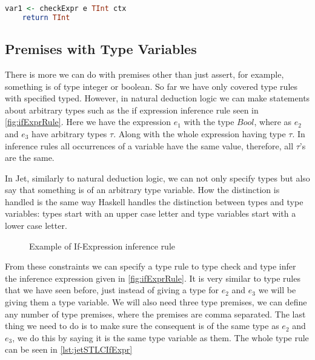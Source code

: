 \begin{lstlisting}[caption = Code generated for inferExpr from TExprPred, label=lst:codeTExprPredInfer, language=Haskell]
    var1 <- checkExpr e TInt ctx
    return TInt
\end{lstlisting}

\subsection{Premises with Type Variables}
There is more we can do with premises other than just assert, for example, something is of type integer or boolean.
So far we have only covered type rules with specified typed.
However, in natural deduction logic we can make statements about arbitrary types such as the if expression inference rule seen in \autoref{fig:ifExprRule}.
Here we have the expression $e_1$ with the type $Bool$, where as $e_2$ and $e_3$ have arbitrary types $\tau$.
Along with the whole expression having type $\tau$.
In inference rules all occurrences of a variable have the same value, therefore, all $\tau$'s are the same.

In Jet, similarly to natural deduction logic, we can not only specify types but also say that something is of an arbitrary type variable.
How the distinction is handled is the same way Haskell handles the distinction between types and type variables: types start with an upper case letter and type variables start with a lower case letter.

\begin{figure}[tbp]
    \begin{prooftree}
    \end{prooftree}
    \label{fig:ifExprRule}
    \caption{Example of If-Expression inference rule}
\end{figure}

From these constraints we can specify a type rule to type check and type infer the inference expression given in \autoref{fig:ifExprRule}.
It is very similar to type rules that we have seen before, just instead of giving a type for $e_2$ and $e_3$ we will be giving them a type variable.
We will also need three type premises, we can define any number of type premises, where the premises are comma separated.
The last thing we need to do is to make sure the consequent is of the same type as $e_2$ and $e_3$, we do this by saying it is the same type variable as them.
The whole type rule can be seen in \autoref{lst:jetSTLCIfExpr}

